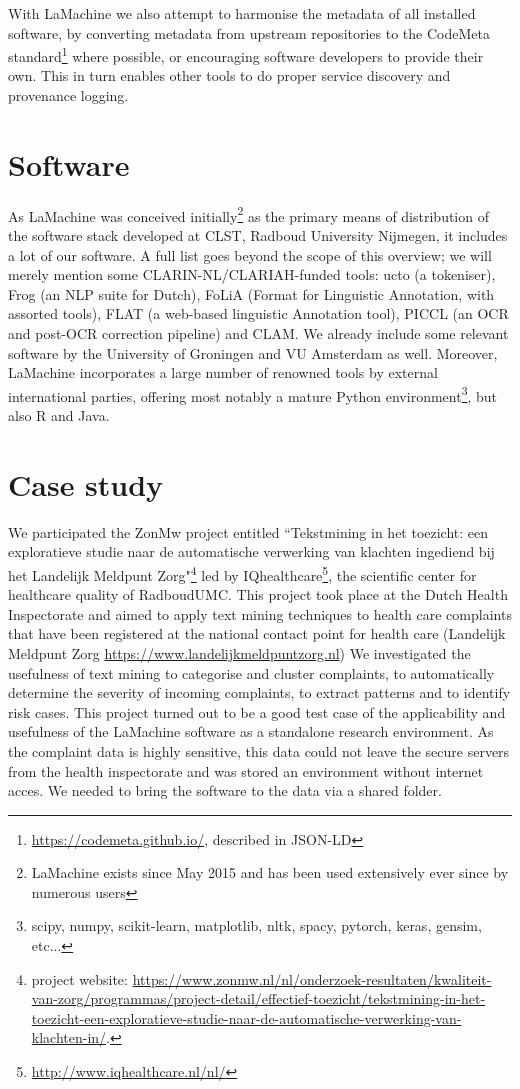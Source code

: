\documentclass[a4paper,11pt]{article}
\begin{document}
With LaMachine we also attempt to harmonise the metadata of all installed software, by converting metadata from upstream repositories to
the CodeMeta standard\footnote{\url{https://codemeta.github.io/}, described in JSON-LD} \cite{codemeta,codemetar} where possible, or encouraging software developers to provide
their own. This in turn enables other tools to do proper service discovery and provenance logging.

\section{Software}

As LaMachine was conceived initially\footnote{LaMachine exists since May 2015 and has been used extensively ever since by
numerous users} as the primary means of distribution of the software stack developed at CLST,
Radboud University Nijmegen, it includes a lot of our software. A full list goes beyond the scope of this overview; we
will merely mention some CLARIN-NL/CLARIAH-funded tools: ucto (a tokeniser), Frog (an NLP suite for Dutch), FoLiA (Format
for Linguistic Annotation, with assorted tools), FLAT (a web-based linguistic Annotation tool), PICCL (an OCR and
post-OCR correction pipeline) and CLAM. We already include some relevant software by the University of Groningen and VU
Amsterdam as well. Moreover, LaMachine incorporates a large number of renowned tools by external international parties,
offering most notably a mature Python environment\footnote{scipy, numpy, scikit-learn, matplotlib, nltk, spacy, pytorch,
keras, gensim, etc...}, but also R and Java.


\section{Case study}\label{sec-case}

We participated the ZonMw project entitled ``Tekstmining in het toezicht: een exploratieve studie naar de automatische verwerking van klachten ingediend bij het Landelijk Meldpunt Zorg"\footnote{project website: \url{https://www.zonmw.nl/nl/onderzoek-resultaten/kwaliteit-van-zorg/programmas/project-detail/effectief-toezicht/tekstmining-in-het-toezicht-een-exploratieve-studie-naar-de-automatische-verwerking-van-klachten-in/}. } led by IQhealthcare\footnote{\url{http://www.iqhealthcare.nl/nl/}}, the scientific center for healthcare quality of RadboudUMC.
This project took place at the Dutch Health Inspectorate and aimed to apply text mining techniques to health care complaints that have been registered at the national contact point for health care (Landelijk Meldpunt Zorg \url{https://www.landelijkmeldpuntzorg.nl})
We investigated the usefulness of text mining to categorise and cluster complaints, to automatically determine the severity of incoming complaints, to extract patterns  and to identify risk cases. This project turned out to be a good test case of the applicability and usefulness of the LaMachine software as a standalone research environment.
As the complaint data is highly sensitive, this data could not leave the secure servers from the health inspectorate and was stored an environment without internet acces. We needed to bring the software to the data via a shared folder.
\end{document}
